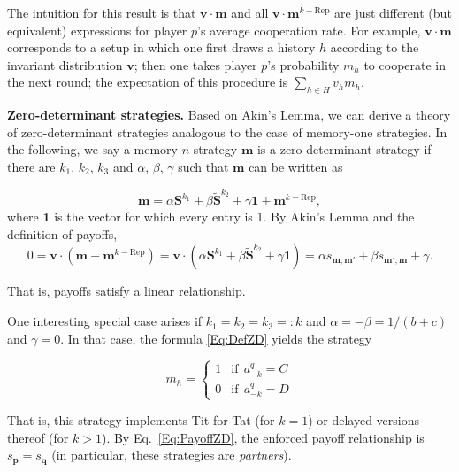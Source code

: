 \documentclass{article}
\theoremstyle{definition}
\begin{document}
The intuition for this result is that $\mathbf{v}\cdot \mathbf{m}$ and all
$\mathbf{v}\cdot \mathbf{m}^{k-\text{Rep}}$ are just different (but equivalent)
expressions for player $p$'s average cooperation rate. For example,
$\mathbf{v}\cdot\mathbf{m}$ corresponds to a setup in which one first draws a
history $h$ according to the invariant distribution $\mathbf{v}$; then one takes
player $p$'s probability $m_h$ to cooperate in the next round; the expectation
of this procedure is $\sum_{h\in H} v_h m_h$.

\noindent
{\bf Zero-determinant strategies.}
Based on Akin's Lemma, we can derive a theory of zero-determinant strategies
analogous to the case of memory-one strategies. In the following, we say a
memory-$n$ strategy $\mathbf{m}$ is a zero-determinant strategy if there are
$k_1$, $k_2$, $k_3$ and $\alpha$, $\beta$, $\gamma$ such that $\mathbf{m}$ can
be written as

\begin{equation} \label{Eq:DefZD}
\mathbf{m} = \alpha \mathbf{S}^{k_1} + \beta \mathbf{\tilde{S}}^{k_2} + \gamma \mathbf{1} + \mathbf{m}^{k-\text{Rep}},  
\end{equation} 
where $\mathbf{1}$ is the vector for which every entry is 1. By Akin's Lemma and the definition of payoffs,
\begin{equation} \label{Eq:PayoffZD}
0 = \mathbf{v} \cdot  (\mathbf{m} - \mathbf{m}^{k-\text{Rep}}) = \mathbf{v} \cdot (\alpha \mathbf{S}^{k_1} + \beta \mathbf{\tilde{S}}^{k_2} + \gamma \mathbf{1} ) = \alpha s_{\mathbf{m}, \mathbf{m'}} + \beta s_{\mathbf{m'}, \mathbf{m}} + \gamma. 
\end{equation}

That is, payoffs satisfy a linear relationship. 

One interesting special case arises if $k_1\!=\!k_2\!=\!k_3\!=:\!k$ and $\alpha
= -\beta =1/(b\!+\!c)$ and $\gamma=0$. In that case, the formula
\eqref{Eq:DefZD} yields the strategy

\begin{equation}
m_h = \left\{
\begin{array}{ll}
1	&\text{if}~~a^q_{-k}=C\\
0	&\text{if}~~a^q_{-k}=D
\end{array}
\right.
\end{equation}

That is, this strategy implements Tit-for-Tat (for $k\!=\!1$) or delayed
versions thereof (for $k\!>\!1$). By Eq.~\eqref{Eq:PayoffZD}, the enforced
payoff relationship is $s_\mathbf{p}\!=\! s_\mathbf{q}$ (in particular, these
strategies are {\it partners}).
\end{document}

